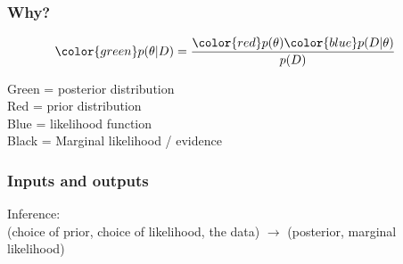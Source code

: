 \documentclass{beamer}
\begin{document}
\begin{frame}
\frametitle{Why?}


\begin{align}
{\color{green}p(\theta | D)} &= \frac{{\color{red}p(\theta)}{\color{blue}p(D|\theta)}}{p(D)}
\end{align}

Green = posterior distribution\\
Red = prior distribution\\
Blue = likelihood function\\
Black = Marginal likelihood / evidence

\end{frame}


\begin{frame}
\frametitle{Inputs and outputs}

Inference:\\ (choice of prior, choice of likelihood, the data) $\to$ (posterior, marginal likelihood)

\end{frame}
\end{document}
